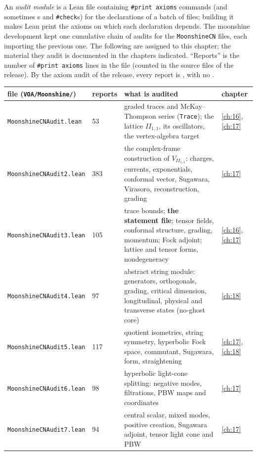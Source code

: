An \emph{audit module} is a Lean file containing \texttt{\#print axioms} commands (and sometimes s and
\texttt{\#check}s) for the declarations of a batch of files; building it makes Lean print the axioms on which each
declaration depends.  The moonshine development kept one cumulative chain of audits for the \texttt{MoonshineCN} files,
each importing the previous one.  The following are assigned to this chapter; the material they audit is documented in
the chapters indicated.  ``Reports'' is the number of \texttt{\#print axioms} lines in the file (counted in the source
files of the release).  By the axiom audit of the release, every report is , with no
.
\begin{center}\small
\begin{longtable}{p{}p{}p{}p{}}
\toprule
file (\texttt{VOA/Moonshine/}) & reports & what is audited & chapter\\
\midrule
\endhead
\texttt{MoonshineCNAudit.lean} & 53 & graded traces and McKay--Thompson series (\texttt{Trace}); the lattice $I\!I_{1,1}$, its
  oscillators, the vertex-algebra target & \ref{ch:16}, \ref{ch:17}\\
\texttt{MoonshineCNAudit2.lean} & 383 & the complex-frame construction of $V_{I\!I_{1,1}}$: charges, currents, exponentials,
  conformal vector, Sugawara, Virasoro, reconstruction, grading & \ref{ch:17}\\
\texttt{MoonshineCNAudit3.lean} & 105 & trace bounds; \textbf{the statement file}; tensor fields, conformal structure,
  grading, momentum; Fock adjoint; lattice and tensor forms, nondegeneracy & \ref{ch:16}, \ref{ch:17}\\
\texttt{MoonshineCNAudit4.lean} & 97 & abstract string module: generators, orthogonals, grading, critical dimension,
  longitudinal, physical and transverse states (no-ghost core) & \ref{ch:18}\\
\texttt{MoonshineCNAudit5.lean} & 117 & quotient isometries, string symmetry, hyperbolic Fock space, commutant, Sugawara,
  form, straightening & \ref{ch:17}, \ref{ch:18}\\
\texttt{MoonshineCNAudit6.lean} & 98 & hyperbolic light-cone splitting: negative modes, filtrations, PBW maps and
  coordinates & \ref{ch:17}\\
\texttt{MoonshineCNAudit7.lean} & 94 & central scalar, mixed modes, positive creation, Sugawara adjoint, tensor light cone
  and PBW & \ref{ch:17}\\

\end{longtable}
\end{center}
